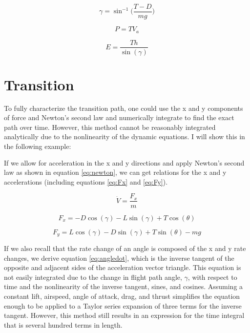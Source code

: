 \documentclass[10pt,english]{article}
\begin{document}
\begin{equation}
\label{eq:FPA}
\gamma = \sin^{-1}\Bigg(\frac{T-D}{mg}\Bigg)
\end{equation}

\begin{equation}
\label{eq:power}
P = T V_a
\end{equation}

\begin{equation}
\label{eq:energy}
E = \frac{T h }{\sin(\gamma)}
\end{equation}



\section{Transition}

To fully characterize the transition path, one could use the x and y components of force and Newton's second law and numerically integrate to find the exact path over time.  However, this method cannot be reasonably integrated analytically due to the nonlinearity of the dynamic equations.  I will show this in the following example:

If we allow for acceleration in the x and y directions and apply Newton's second law as shown in equation \ref{eq:newton}, we can get relations for the x and y accelerations (including equations \ref{eq:Fx} and \ref{eq:Fy}).

\begin{equation}
\label{eq:newton}
\dot{V} = \frac{F_x}{m}
\end{equation}

\begin{equation}
\label{eq:Fx}
F_x = -D \cos(\gamma) - L \sin(\gamma) + T \cos(\theta)
\end{equation}

\begin{equation}
\label{eq:Fy}
F_y = L \cos(\gamma) - D \sin(\gamma) + T \sin(\theta) - m g
\end{equation}

\vspace{10pt}
\noindent If we also recall that the rate change of an angle is composed of the x and y rate changes, we derive equation \ref{eq:angledot}, which is the inverse tangent of the opposite and adjacent sides of the acceleration vector triangle.  This equation is not easily integrated due to the change in flight path angle, $\gamma$, with respect to time and the nonlinearity of the inverse tangent, sines, and cosines.  Assuming a constant lift, airspeed, angle of attack, drag, and thrust simplifies the equation enough to be applied to a Taylor series expansion of three terms for the inverse tangent.  However, this method still results in an expression for the time integral that is several hundred terms in length.
\end{document}
